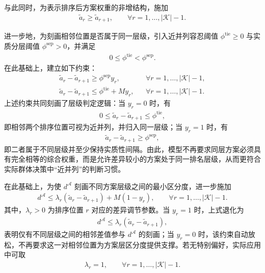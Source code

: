 \documentclass{article}
\begin{document}
与此同时，为表示排序后方案权重的非增结构，施加
\begin{align}
    \tilde a_r\ge \tilde a_{r+1},
    \qquad \forall r=1,\dots,|\mathcal K|-1.
\end{align}

进一步地，为刻画相邻位置是否属于同一层级，引入近并列容忍阈值 $\phi^{\mathrm{tie}}\ge 0$ 与实质分层阈值 $\phi^{\mathrm{sep}}>0$，并满足
\begin{align}
    0\le \phi^{\mathrm{tie}} < \phi^{\mathrm{sep}}.
\end{align}
在此基础上，建立如下约束：
\begin{align}
    \tilde a_r-\tilde a_{r+1} \ge \phi^{\mathrm{sep}} y_r,
    && \forall r=1,\dots,|\mathcal K|-1, \label{eq:level_gap} \\
    \tilde a_r-\tilde a_{r+1} \le \phi^{\mathrm{tie}} + M y_r,
    && \forall r=1,\dots,|\mathcal K|-1. \label{eq:level_bound}
\end{align}
上述约束共同刻画了层级判定逻辑：当 $y_r=0$ 时，有
\begin{align*}
    0\le \tilde a_r-\tilde a_{r+1}\le \phi^{\mathrm{tie}},
\end{align*}
即相邻两个排序位置可视为近并列，并归入同一层级；当 $y_r=1$ 时，有
\begin{align*}
    \tilde a_r-\tilde a_{r+1}\ge \phi^{\mathrm{sep}},
\end{align*}
即二者属于不同层级并至少保持实质性间隔。由此，模型不再要求同层方案必须具有完全相等的综合权重，而是允许差异较小的方案处于同一排名层级，从而更符合实际群体决策中“近并列”的判断习惯。

在此基础上，为使 $d^{\mathcal A}$ 刻画不同方案层级之间的最小区分度，进一步施加
\begin{align}
    d^{\mathcal A}\le \lambda_r(\tilde a_r-\tilde a_{r+1}) + M(1-y_r),
    \qquad \forall r=1,\dots,|\mathcal K|-1. \label{eq:level_diff}
\end{align}
其中，$\lambda_r>0$ 为排序位置 $r$ 对应的差异调节参数。当 $y_r=1$ 时，上式退化为
\begin{align*}
    d^{\mathcal A}\le \lambda_r(\tilde a_r-\tilde a_{r+1}),
\end{align*}
表明仅有不同层级之间的相邻差值参与 $d^{\mathcal A}$ 的刻画；当 $y_r=0$ 时，该约束自动放松，不再要求这一对相邻位置为方案层区分度提供支撑。若无特别偏好，实际应用中可取
\begin{align}
    \lambda_r=1,
    \qquad \forall r=1,\dots,|\mathcal K|-1.
\end{align}
\end{document}
